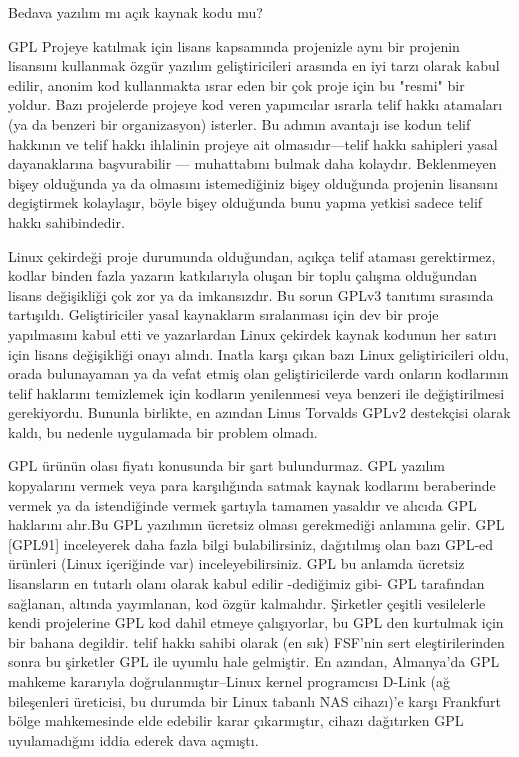 \begin{section}{Bedava yazılım mı açık kaynak kodu mu?}
\begin{subsection}{GPL}
Projeye katılmak için  lisans kapsamında projenizle aynı bir projenin lisansını kullanmak özgür yazılım geliştiricileri arasında en iyi tarzı olarak kabul edilir, anonim kod  kullanmakta ısrar eden  bir çok proje için bu  "resmi" bir yoldur. Bazı projelerde projeye kod veren yapımcılar ısrarla telif hakkı atamaları (ya da benzeri bir organizasyon) isterler. Bu adımın avantajı ise kodun telif hakkının ve telif hakkı ihlalinin projeye ait olmasıdır—telif hakkı sahipleri yasal dayanaklarına başvurabilir — muhattabını bulmak daha kolaydır. Beklenmeyen bişey olduğunda ya da olmasını istemediğiniz bişey olduğunda projenin lisansını degiştirmek kolaylaşır, böyle bişey olduğunda bunu yapma yetkisi sadece telif hakkı sahibindedir.

Linux çekirdeği proje durumunda olduğundan, açıkça telif ataması gerektirmez, kodlar binden fazla yazarın katkılarıyla oluşan bir toplu çalışma  olduğundan lisans değişikliği çok zor ya da imkansızdır. Bu sorun GPLv3 tanıtımı sırasında tartışıldı. Geliştiriciler yasal kaynakların sıralanması için dev bir proje yapılmasını kabul etti ve yazarlardan Linux çekirdek kaynak kodunun her satırı için lisans değişikliği onayı alındı. Inatla karşı çıkan bazı Linux geliştiricileri oldu, orada bulunayaman ya da vefat etmiş olan geliştiricilerde vardı onların kodlarının telif haklarını temizlemek için kodların yenilenmesi veya benzeri ile değiştirilmesi gerekiyordu. Bununla birlikte, en azından Linus Torvalds GPLv2  destekçisi olarak kaldı, bu nedenle uygulamada bir problem olmadı.

GPL ürünün olası fiyatı konusunda bir şart bulundurmaz. GPL yazılım kopyalarını vermek veya para karşılığında satmak kaynak kodlarını beraberinde vermek ya da istendiğinde vermek şartıyla tamamen yasaldır ve alıcıda GPL haklarını alır.Bu GPL yazılımın ücretsiz olması gerekmediği anlamına gelir. GPL [GPL91] inceleyerek daha fazla bilgi bulabilirsiniz, dağıtılmış olan bazı  GPL-ed ürünleri (Linux içeriğinde var) inceleyebilirsiniz. GPL  bu anlamda ücretsiz lisansların en tutarlı olanı olarak kabul edilir -dediğimiz gibi- GPL tarafından sağlanan, altında yayımlanan, kod  özgür kalmalıdır. Şirketler çeşitli vesilelerle kendi projelerine GPL kod dahil etmeye çalışıyorlar, bu GPL den kurtulmak için bir bahana degildir. telif hakkı sahibi olarak (en sık) FSF'nin sert eleştirilerinden sonra bu şirketler GPL ile uyumlu hale gelmiştir. En azından, Almanya'da GPL mahkeme kararıyla doğrulanmıştır--Linux kernel programcısı D-Link (ağ bileşenleri üreticisi, bu durumda bir Linux tabanlı NAS cihazı)'e karşı Frankfurt bölge mahkemesinde elde edebilir karar çıkarmıştır, cihazı dağıtırken GPL uyulamadığını iddia ederek dava açmıştı.


\end{subsection}
\end{section}
